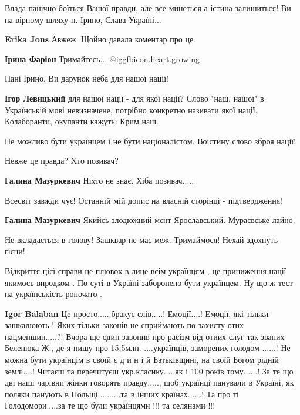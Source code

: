 \begin{itemize}

Влада панічно боїться Вашої правди, але все минеться а істина залишиться! Ви на
вірному шляху п. Ірино, Слава Україні...

\begin{itemize} %
\textbf{Erika Jons} Авжеж. Щойно давала коментар про це.

\textbf{Ірина Фаріон} Тримайтесь...  @igg{fbicon.heart.growing} 
\end{itemize} %

Пані Ірино, Ви дарунок неба для нашої нації!

\textbf{Ігор Левицький} для нашої нації - для якої нації? Слово "наш, нашої" в Українській мові невизначене, потрібно конкретно називати якої нації. Колаборанти, окупанти кажуть: Крим наш.

Не можливо бути українцем і не бути націоналістом. Воістину слово зброя нації!

Невже це правда? Хто позивач?

\begin{itemize} %
\textbf{Галина Мазуркевич} Ніхто не знає. Хіба позивач.....

Всесвіт завжди чує! Останній мій допис на власній сторінці - підтвердження!

\textbf{Галина Мазуркевич} Якийсь злодюжний мєнт Ярославський. Мураєвське лайно.

Не вкладається в голову! Зашквар не має меж. Тримаймося! Нехай здохнуть гієни!
\end{itemize} %


Відкриття цієї справи це плювок в лице всім українцям , це приниження нації
якимось виродком . По суті в Україні заборонено бути українцем. Ну що ж тест на
українськість ропочато .

\begin{itemize} %
\textbf{Igor Balaban}
Це просто......бракує
слів.....!
Емоції....!
Емоції, які тільки зашкалюють !
Яких тільки законів не сприймають по захисту отих нацменшин.....?!
Вчора ще один завопив про расізм
від отиих слуг так званих Беленюка Ж.,
де я пишу про 15,5млн. ....українців, заморених голодом
......!
Не можна бути українцім в своїй
є д и н і й Батьківщині, на своїй Богом рідній землі....!
Читаєш та перечитуєш укр.класику.....як і
100 років тому......!
За те що дві наші чарівни жінки говорять правду.....,
щоб українці панували в Україні,
як поляки панують в Польщі..........та в інших країнах......!
Та про ті Голодомори.....за те що були українцями !!! та селянами !!!


\end{itemize}
\end{itemize}
